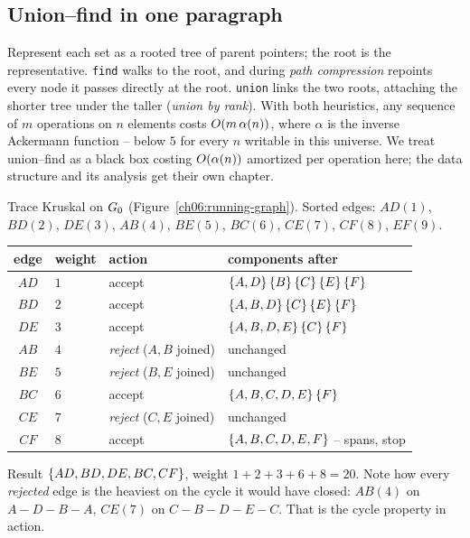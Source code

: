 \subsection{Union--find in one paragraph}

Represent each set as a rooted tree of parent pointers; the root is the representative. \texttt{find} walks to the root, and during \emph{path compression} repoints every node it passes directly at the root. \texttt{union} links the two roots, attaching the shorter tree under the taller (\emph{union by rank}). With both heuristics, any sequence of $m$ operations on $n$ elements costs $O(m\,\alpha(n))$, where $\alpha$ is the inverse Ackermann function -- below $5$ for every $n$ writable in this universe. We treat union--find as a black box costing $O(\alpha(n))$ amortized per operation here; the data structure and its analysis get their own chapter.

\begin{labbox}
Trace Kruskal on $G_0$ (Figure~\ref{ch06:running-graph}). Sorted edges:
$AD(1)$, $BD(2)$, $DE(3)$, $AB(4)$, $BE(5)$, $BC(6)$, $CE(7)$, $CF(8)$, $EF(9)$.

\begin{center}
\begin{tabular}{clll}
\toprule
edge & weight & action & components after \\
\midrule
$AD$ & $1$ & accept & $\{A,D\}\,\{B\}\,\{C\}\,\{E\}\,\{F\}$ \\
$BD$ & $2$ & accept & $\{A,B,D\}\,\{C\}\,\{E\}\,\{F\}$ \\
$DE$ & $3$ & accept & $\{A,B,D,E\}\,\{C\}\,\{F\}$ \\
$AB$ & $4$ & \emph{reject} ($A,B$ joined) & unchanged \\
$BE$ & $5$ & \emph{reject} ($B,E$ joined) & unchanged \\
$BC$ & $6$ & accept & $\{A,B,C,D,E\}\,\{F\}$ \\
$CE$ & $7$ & \emph{reject} ($C,E$ joined) & unchanged \\
$CF$ & $8$ & accept & $\{A,B,C,D,E,F\}$ -- spans, stop \\
\bottomrule
\end{tabular}
\end{center}

Result $\{AD,BD,DE,BC,CF\}$, weight $1+2+3+6+8=20$. Note how every \emph{rejected} edge is the heaviest on the cycle it would have closed: $AB(4)$ on $A\!-\!D\!-\!B\!-\!A$, $CE(7)$ on $C\!-\!B\!-\!D\!-\!E\!-\!C$. That is the cycle property in action.
\end{labbox}


